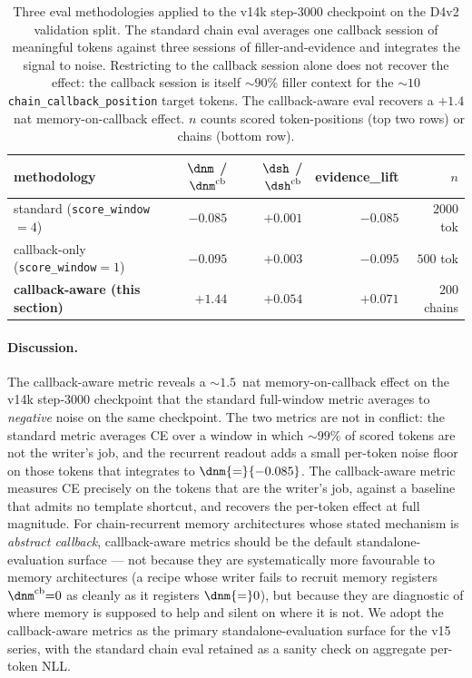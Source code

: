 \begin{table}[t]
\centering
\caption{Three eval methodologies applied to the v14k step-$3000$
checkpoint on the D4v2 validation split. The standard chain eval
averages one callback session of meaningful tokens against three
sessions of filler-and-evidence and integrates the signal to noise.
Restricting to the callback session alone does not recover the
effect: the callback session is itself $\sim\!90\%$ filler context
for the $\sim\!10$ \texttt{chain\_callback\_position} target tokens.
The callback-aware eval recovers a $+1.4$~nat memory-on-callback
effect. $n$ counts scored token-positions (top two rows) or chains
(bottom row).}
\label{tab:eval_methodology_compare}
\small
\begin{tabular}{lrrrr}
\toprule
methodology & $\dnm$ / $\dnm^{\text{cb}}$ & $\dsh$ / $\dsh^{\text{cb}}$ & evidence\_lift & $n$ \\
\midrule
standard (\texttt{score\_window}${=}4$)
                                          & $-0.085$ & $+0.001$ & $-0.085$ & $2000$ tok \\
callback-only (\texttt{score\_window}${=}1$)
                                          & $-0.095$ & $+0.003$ & $-0.095$ & $500$ tok \\
\textbf{callback-aware (this section)}    & $\boldsymbol{+1.44}$ & $\boldsymbol{+0.054}$ & $\boldsymbol{+0.071}$ & $200$ chains \\
\bottomrule
\end{tabular}
\end{table}

\paragraph{Discussion.} The callback-aware metric reveals a
$\sim\!1.5$~nat memory-on-callback effect on the v14k step-$3000$
checkpoint that the standard full-window metric averages to
\emph{negative} noise on the same checkpoint. The two metrics are
not in conflict: the standard metric averages CE over a window in
which $\sim\!99\%$ of scored tokens are not the writer's job, and
the recurrent readout adds a small per-token noise floor on those
tokens that integrates to $\dnm{=}{-0.085}$. The callback-aware
metric measures CE precisely on the tokens that are the writer's
job, against a baseline that admits no template shortcut, and
recovers the per-token effect at full magnitude. For
chain-recurrent memory architectures whose stated mechanism is
\emph{abstract callback}, callback-aware metrics should be the
default standalone-evaluation surface --- not because they are
systematically more favourable to memory architectures (a recipe
whose writer fails to recruit memory registers $\dnm^{\text{cb}}{=}0$
as cleanly as it registers $\dnm{=}0$), but because they are
diagnostic of where memory is supposed to help and silent on where
it is not. We adopt the callback-aware metrics as the primary
standalone-evaluation surface for the v15 series, with the standard
chain eval retained as a sanity check on aggregate per-token NLL.
